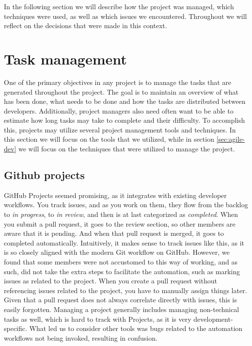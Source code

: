 In the following section we will describe how the project was managed, which techniques were used, as well as which issues we encountered. Throughout we will reflect on the decisions that were made in this context.

\section{Task management}
One of the primary objectives in any project is to manage the tasks that are generated throughout the project. The goal is to maintain an overview of what has been done, what needs to be done and how the tasks are distributed between developers. Additionally, project managers also need often want to be able to estimate how long tasks may take to complete and their difficulty. To accomplish this, projects may utilize several project management tools and techniques. In this section we will focus on the tools that we utilized, while in section \ref{sec:agile-dev} we will focus on the techniques that were utilized to manage the project.

\subsection{Github projects}
GitHub Projects seemed promising, as it integrates with existing developer workflows. You track issues, and as you work on them, they flow from the backlog to \textit{in progress}, to \textit{in review}, and then is at last categorized as \textit{completed}. When you submit a pull request, it goes to the review section, so other members are aware that it is pending. And when that pull request is merged, it goes to completed automatically.
Intuitively, it makes sense to track issues like this, as it is so closely aligned with the modern Git workflow on GitHub. 
However, we found that some members were not accustomed to this way of working, and as such, did not take the extra steps to facilitate the automation, such as marking issues as related to the project.
When you create a pull request without referencing issues related to the project, you have to manually assign things later. Given that a pull request does not always correlate directly with issues, this is easily forgotten.
Managing a project generally includes managing non-technical tasks as well, which is hard to track with Projects, as it is very development-specific.
What led us to consider other tools was bugs related to the automation workflows not being invoked, resulting in confusion.

